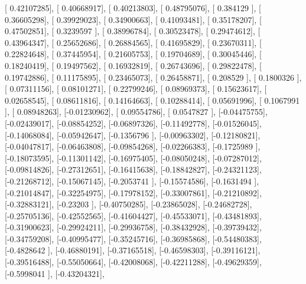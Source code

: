 \documentclass{article}
\begin{document}
       [ 0.42107285],
       [ 0.40668917],
       [ 0.40213803],
       [ 0.48795076],
       [ 0.384129  ],
       [ 0.36605298],
       [ 0.39929023],
       [ 0.34900663],
       [ 0.41093481],
       [ 0.35178207],
       [ 0.47502851],
       [ 0.3239597 ],
       [ 0.38996784],
       [ 0.30523478],
       [ 0.29474612],
       [ 0.43964347],
       [ 0.25652686],
       [ 0.26884565],
       [ 0.41695829],
       [ 0.23670311],
       [ 0.22824648],
       [ 0.37445954],
       [ 0.21605753],
       [ 0.19704689],
       [ 0.30045446],
       [ 0.18240419],
       [ 0.19497562],
       [ 0.16932819],
       [ 0.26743696],
       [ 0.29822478],
       [ 0.19742886],
       [ 0.11175895],
       [ 0.23465073],
       [ 0.26458871],
       [ 0.208529  ],
       [ 0.1800326 ],
       [ 0.07311156],
       [ 0.08101271],
       [ 0.22799246],
       [ 0.08969373],
       [ 0.15623617],
       [ 0.02658545],
       [ 0.08611816],
       [ 0.14164663],
       [ 0.10288414],
       [ 0.05691996],
       [ 0.1067991 ],
       [ 0.08948263],
       [-0.01230962],
       [ 0.09554786],
       [ 0.0547827 ],
       [-0.04475755],
       [-0.02439017],
       [-0.08854252],
       [-0.06897326],
       [-0.11492778],
       [-0.01526045],
       [-0.14068084],
       [-0.05942647],
       [-0.1356796 ],
       [-0.00963302],
       [-0.12180821],
       [-0.04047817],
       [-0.06463808],
       [-0.09854268],
       [-0.02266383],
       [-0.1725989 ],
       [-0.18073595],
       [-0.11301142],
       [-0.16975405],
       [-0.08050248],
       [-0.07287012],
       [-0.09814826],
       [-0.27312651],
       [-0.16415638],
       [-0.18842827],
       [-0.24321123],
       [-0.21268712],
       [-0.15067145],
       [-0.2053741 ],
       [-0.15574586],
       [-0.1631494 ],
       [-0.21014847],
       [-0.32254975],
       [-0.17978152],
       [-0.33007861],
       [-0.21210892],
       [-0.32883121],
       [-0.23203   ],
       [-0.40750285],
       [-0.23865028],
       [-0.24682728],
       [-0.25705136],
       [-0.42552565],
       [-0.41604427],
       [-0.45533071],
       [-0.43481893],
       [-0.31900623],
       [-0.29924211],
       [-0.29936758],
       [-0.38432928],
       [-0.39739432],
       [-0.34759208],
       [-0.40995477],
       [-0.35245716],
       [-0.36985868],
       [-0.54480383],
       [-0.4828642 ],
       [-0.46880191],
       [-0.37165518],
       [-0.46598303],
       [-0.39116121],
       [-0.39516488],
       [-0.55050664],
       [-0.42008068],
       [-0.42211288],
       [-0.49629359],
       [-0.5998041 ],
       [-0.43204321],
\end{document}
